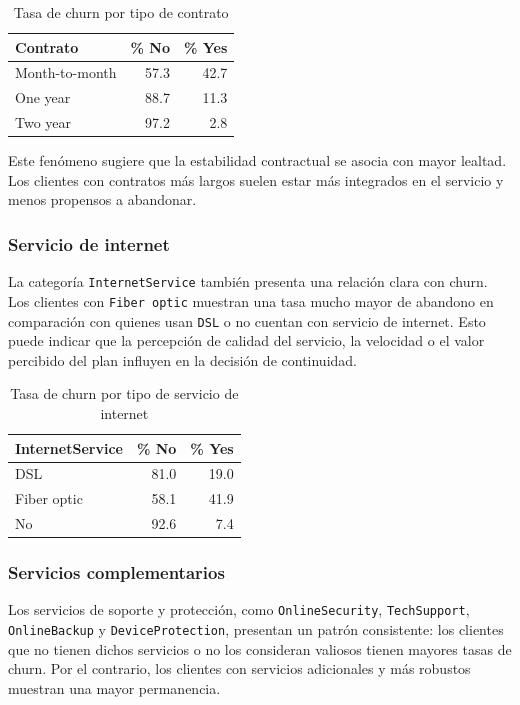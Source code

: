\documentclass[conference]{IEEEtran}
\begin{document}
\begin{table}[H]
\centering
\caption{Tasa de churn por tipo de contrato}
\small
\begin{tabular}{lrr}
\toprule
Contrato & \% No & \% Yes \\
\midrule
Month-to-month & 57.3 & 42.7 \\
One year & 88.7 & 11.3 \\
Two year & 97.2 & 2.8 \\
\bottomrule
\end{tabular}
\end{table}

Este fenómeno sugiere que la estabilidad contractual se asocia con mayor lealtad. Los clientes con contratos más largos suelen estar más integrados en el servicio y menos propensos a abandonar.

\subsubsection{Servicio de internet}
La categoría \texttt{InternetService} también presenta una relación clara con churn. Los clientes con \texttt{Fiber optic} muestran una tasa mucho mayor de abandono en comparación con quienes usan \texttt{DSL} o no cuentan con servicio de internet. Esto puede indicar que la percepción de calidad del servicio, la velocidad o el valor percibido del plan influyen en la decisión de continuidad.

\begin{table}[H]
\centering
\caption{Tasa de churn por tipo de servicio de internet}
\small
\begin{tabular}{lrr}
\toprule
InternetService & \% No & \% Yes \\
\midrule
DSL & 81.0 & 19.0 \\
Fiber optic & 58.1 & 41.9 \\
No & 92.6 & 7.4 \\
\bottomrule
\end{tabular}
\end{table}

\subsubsection{Servicios complementarios}
Los servicios de soporte y protección, como \texttt{OnlineSecurity}, \texttt{TechSupport}, \texttt{OnlineBackup} y \texttt{DeviceProtection}, presentan un patrón consistente: los clientes que no tienen dichos servicios o no los consideran valiosos tienen mayores tasas de churn. Por el contrario, los clientes con servicios adicionales y más robustos muestran una mayor permanencia.
\end{document}
